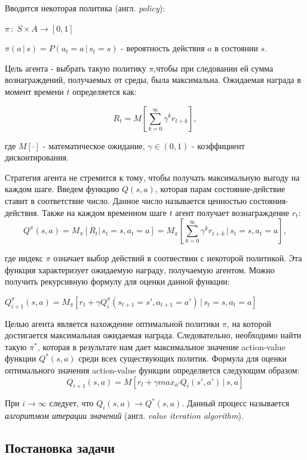 \documentclass[a4paper]{report}
\theoremstyle{definition}
\theoremstyle{plain}
\theoremstyle{remark}
\theoremstyle{remark}
\theoremstyle{definition}
\begin{document}
Вводится некоторая политика (англ. \textit{policy}):
\begin{center}
	$\pi \, : \; S \times A \rightarrow [0, 1]$

$\pi(a\,|\,s) = P(a_t=a\,|\,s_t=s)$ - вероятность действия $a$ в состоянии $s$.
\end{center}

Цель агента - выбрать такую политику $\pi$,чтобы при следовании ей сумма вознаграждений, получаемых от среды, была максимальна.
Ожидаемая награда в момент времени $t$ определяется как:

$$R_t = M\left[\sum_{k=0}^{\infty}\gamma^kr_{t+k}\right],$$

где $M[\cdot]$ - математическое ожидание, $\gamma\in(0, 1)$ - коэффициент дисконтирования.

Стратегия агента не стремится к тому, чтобы получать максимальную выгоду на каждом шаге. Введем функцию $Q(s,a)$, которая парам состояние-действие ставит в соответствие число. Данное число называется ценностью состояния-действия. Также на каждом временном шаге $ t $ агент получает вознаграждение $ r_{t} $:
$$Q^{\pi}(s, a) = M_{\pi}[R_t|\,s_t=s, a_t=a] = M_{\pi}\left[\sum_{k=0}^{\infty}\gamma^kr_{t+k}\,|\,s_t=s, a_t=a\right],$$

где индекс $\pi$ означает выбор действий в соотвествии с некоторой политикой. Эта функция характеризует ожидаемую награду, получаемую агентом. Можно получить рекурсивную формулу для оценки данной функции:

\begin{center}
	$Q_{i+1}^{\pi}(s, a) = M_{\pi}\left[r_t + \gamma Q_{i}^{\pi}(s_{t+1}=s', a_{t+1}=a')\,|\,s_t=s, a_t=a\right]$
\end{center}

Целью агента является нахождение оптимальной политики $\pi$, на которой достигается максимальная ожидаемая награда. Следовательно, необходимо найти такую $\pi^*$, которая в результате нам дает максимальное значение action-value функции $Q^*(s, a)$ среди всех существующих политик. Формула для оценки оптимального значения action-value функции определяется следующим образом:
$$Q_{i+1}(s, a) = M[r_t + \gamma max_{a'}Q_i(s', a')\,|\,s, a]$$

При $i \rightarrow \infty$ следует, что $Q_{i}(s, a) \rightarrow Q^*(s, a)$. Данный процесс называется \textit{алгоритмом итерации значений} (англ. \textit{value iteration algorithm}).

\newpage
\begin{center}
\section{Постановка задачи}
\end{center}
\end{document}
